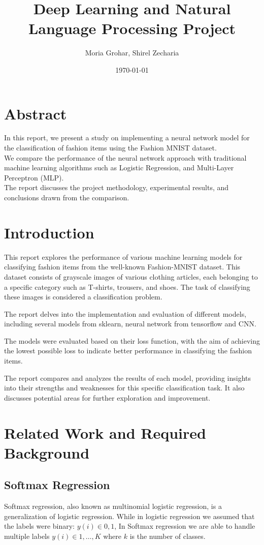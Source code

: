 \documentclass{article}
\title{Deep Learning and Natural Language Processing Project}
\author{Moria Grohar, Shirel Zecharia}
\date{\today}
\begin{document}
\maketitle

\section{Abstract}
In this report, we present a study on implementing a neural network model for the classification of fashion items using the Fashion MNIST dataset.\\
We compare the performance of the neural network approach with traditional machine learning algorithms such as Logistic Regression, and Multi-Layer Perceptron (MLP).\\
The report discusses the project methodology, experimental results, and conclusions drawn from the comparison.

\section{Introduction}
This report explores the performance of various machine learning models for classifying fashion items from the well-known Fashion-MNIST dataset. This dataset consists of grayscale images of various clothing articles, each belonging to a specific category such as T-shirts, trousers, and shoes. The task of classifying these images is considered a classification problem.

The report delves into the implementation and evaluation of different models,
including several models from sklearn, neural network from tensorflow and CNN.

The models were evaluated based on their loss function, with the aim of achieving the lowest possible loss to indicate better performance in classifying the fashion items.

The report compares and analyzes the results of each model, providing insights into their strengths and weaknesses for this specific classification task. It also discusses potential areas for further exploration and improvement.

\section{Related Work and Required Background}
\subsection{Softmax Regression}
Softmax regression, also known as multinomial logistic regression, is a generalization of logistic regression.
While in logistic regression we assumed that the labels were binary: ${y(i)\in{0,1}}$, In Softmax regression we are able to handle multiple labels ${y(i)\in{1,…,K}}$ where ${k}$ is the number of classes.\\
\end{document}
